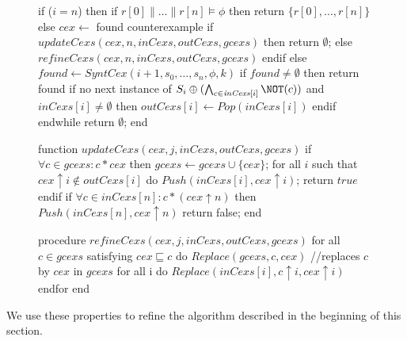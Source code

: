\begin{figure}[t!]
\begin{algo}[caption={Counterexample Search}, label={alg1}]
	    if ($i=n$) then
	        if $r[0] \parallel \dots \parallel r[n] \vDash \phi$ then return $\{r[0],\dots,r[n]\}$
	        else
	            $\mathit{cex} \leftarrow$ found counterexample            
		    if $\mathit{updateCexs}(\mathit{cex},n,\mathit{inCexs},\mathit{outCexs},\mathit{gcexs})$ then return $\emptyset$;	
		    else $\mathit{refineCexs}(\mathit{cex},n,\mathit{inCexs},\mathit{outCexs},\mathit{gcexs})$
	        endif
	    else
	        $\mathit{found} \leftarrow \mathit{SyntCex}(i+1,s_0,\dots,s_n,\phi,k)$
	        if $\mathit{found} \neq \emptyset$ then return found
	        if  no next instance of $S_i \oplus (\bigwedge_{c \in {\mathit{inCexs}[i]}}\NOT(c))$ 
	        	                            and $\mathit{inCexs}[i] \neq \emptyset$ then
		    $\mathit{outCexs}[i] \leftarrow \mathit{Pop(inCexs[i])}$
	    endif    
    endwhile
    return $\emptyset$;
end  
\end{algo}
\end{figure}
\begin{figure}[t!]
\begin{algo}[caption={Auxiliary Function for Updating Counterexamples}, label={alg2}]
function $\mathit{updateCexs}(\mathit{cex}, j, \mathit{inCexs}, \mathit{outCexs}, \mathit{gcexs})$
    if $\forall c \in \mathit{gcexs}: c  * \mathit{cex}$  then 
        $\mathit{gcexs} \leftarrow \mathit{gcexs} \cup \{ cex \}$;  
        for all $i$  such that $\mathit{cex}{\uparrow}i \notin \mathit{\mathit{outCexs}[i]}$ do	            
	    $\mathit{\mathit{Push}(\mathit{inCexs}[i], \mathit{cex}{\uparrow}i)}$; 
	return $true$							
    endif	
    if $\forall c \in \mathit{inCexs}[n] : c*(\mathit{cex} {\uparrow} n)$ then    $\mathit{Push}(\mathit{inCexs}[n], \mathit{cex}{\uparrow}n)$	                   
    return false;
end
\end{algo}
\end{figure}
\begin{figure}[t!]
\begin{algo}[caption={Auxiliary Procedure for Refining Counterexamples}, label={alg3}]
procedure $\mathit{refineCexs}(\mathit{cex}, j, \mathit{inCexs}, \mathit{outCexs}, \mathit{gcexs})$	             
    for all  $c \in \mathit{gcexs}$ satisfying $\mathit{cex} \sqsubseteq c$ do 
        $\mathit{\mathit{Replace}(\mathit{gcexs}, c, \mathit{cex})}$ //replaces $c$ by $\mathit{cex}$ in $\mathit{gcexs}$
        for all i do $\mathit{Replace}(\mathit{inCexs}[i], c{\uparrow}i, \mathit{cex}{\uparrow}i)$       
    endfor    
end         
\end{algo}     
\end{figure}
%
We use these properties  to refine the algorithm described in the beginning of this section. 

